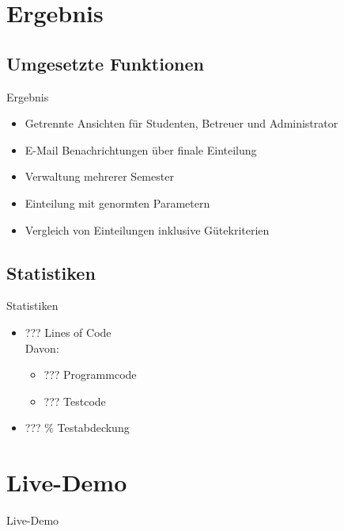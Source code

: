 \documentclass[18pt]{beamer}
\begin{document}
\section{Ergebnis}
\subsection{Umgesetzte Funktionen}
\begin{frame}{Ergebnis} 
\begin{itemize}
 \item Getrennte Ansichten für Studenten, Betreuer und Administrator
 \item E-Mail Benachrichtungen über finale Einteilung
 \item Verwaltung mehrerer Semester
 \item Einteilung mit genormten Parametern
 \item Vergleich von Einteilungen inklusive Gütekriterien
\end{itemize}

\end{frame}

\subsection{Statistiken}
\begin{frame}{Statistiken}
\begin{itemize}
\item ??? Lines of Code \\ Davon:
\begin{itemize}
\item ??? Programmcode
\item ??? Testcode
\end{itemize}
\item ??? \% Testabdeckung
\end{itemize} 
\end{frame}

\section{Live-Demo}
\begin{frame}
 \begin{center}
  \Huge Live-Demo
 \end{center}
\end{frame}
\end{document}
